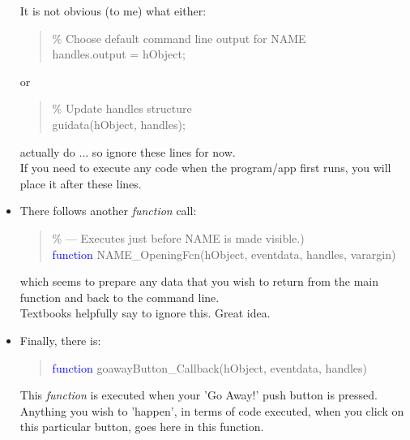 \documentclass{tufte-book} %
\newenvironment{docspecmargin}{\begin{quotation}\ttfamily\footnotesize\parskip0pt\parindent0pt\ignorespaces}{\end{quotation}}
\begin{document}
\begin{itemize}
It is not obvious (to me) what either:
\vspace{-2mm}
\begin{docspecmargin}
\textcolor[rgb]{0,0.501961,0}{\% Choose default command line output for NAME}\\
handles.output = hObject;
\end{docspecmargin}
\vspace{-1mm}
or
\vspace{-2mm}
\begin{docspecmargin}
\textcolor[rgb]{0,0.501961,0}{\% Update handles structure}\\
guidata(hObject, handles);
\end{docspecmargin}
\vspace{-1mm}
actually do ... so ignore these lines for now.
\\If you need to execute any code when the program/app first runs, you will place it after these lines.

\item There follows another \textit{function} call:
\begin{docspecmargin}
\textcolor[rgb]{0,0.501961,0}{\% --- Executes just before NAME is made visible.)}\\
\textcolor{blue}{function} NAME\_OpeningFcn(hObject, eventdata, handles, varargin)
\end{docspecmargin}
which seems to prepare any data that you wish to return from the main function and back to the command line.
\\Textbooks helpfully say to ignore this. Great idea.

\item Finally, there is:
\begin{docspecmargin}
\textcolor{blue}{function} goawayButton\_Callback(hObject, eventdata, handles)
\end{docspecmargin}
This \textit{function} is executed when your 'Go Away!' push button is pressed.
Anything you wish to 'happen', in terms of code executed, when you click on this particular button, goes here in this function. 
\end{itemize}
\end{document}

